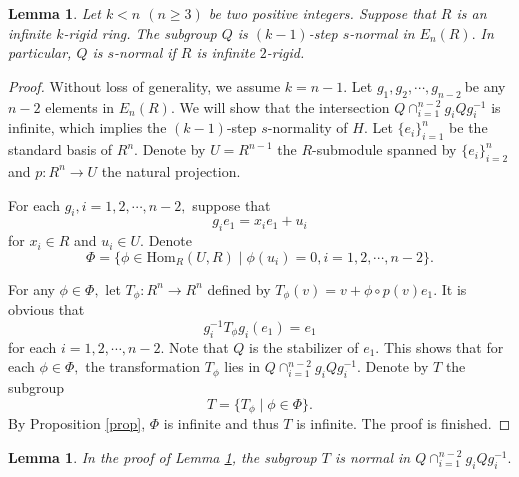 \documentclass{gtpart}     %
\newtheorem{lemma}[theorem]{Lemma}
\begin{document}
\begin{lemma}
\label{ke}Let $k<n$ $(n\geq 3)$ be two positive integers. Suppose that $R$
is an infinite $k$-rigid ring. The subgroup $Q$ is $(k-1)$-step $s$-normal
in $E_{n}(R).$ In particular, $Q$ is $s$-normal if $R$ is infinite $2$-rigid.
\end{lemma}

\begin{proof}
Without loss of generality, we assume $k=n-1.$ Let $g_{1},g_{2},\cdots
,g_{n-2}\ $be any $n-2$ elements in $E_{n}(R).$ We will show that the
intersection $Q\cap _{i=1}^{n-2}g_{i}Qg_{i}^{-1}$ is infinite, which implies
the $(k-1)$-step $s$-normality of $H$. Let $\{e_{i}\}_{i=1}^{n}$ be the
standard basis of $R^{n}.$ Denote by $U=R^{n-1}$ the $R$-submodule spanned
by $\{e_{i}\}_{i=2}^{n}$ and $p:R^{n}\rightarrow U$ the natural projection.

For each $g_{i},i=1,2,\cdots ,n-2,$ suppose that
\begin{equation*}
g_{i}e_{1}=x_{i}e_{1}+u_{i}
\end{equation*}%
for $x_{i}\in R$ and $u_{i}\in U.$ Denote
\begin{equation*}
\Phi =\{\phi \in \mathrm{Hom}_{R}(U,R)\mid \phi (u_{i})=0,i=1,2,\cdots
,n-2\}.
\end{equation*}

For any $\phi \in \Phi ,$ let $T_{\phi }:R^{n}\rightarrow R^{n}$ defined by $%
T_{\phi }(v)=v+\phi \circ p(v)e_{1}.$ It is obvious that
\begin{equation*}
g_{i}^{-1}T_{\phi }g_{i}(e_{1})=e_{1}
\end{equation*}%
for each $i=1,2,\cdots ,n-2.$ Note that $Q$ is the stabilizer of $e_{1}$.
This shows that for each $\phi \in \Phi ,$ the transformation $T_{\phi }$
lies in $Q\cap _{i=1}^{n-2}g_{i}Qg_{i}^{-1}.$ Denote by $T$ the subgroup
\begin{equation*}
T=\{T_{\phi }\mid \phi \in \Phi \}.
\end{equation*}%
By Proposition \ref{prop}, $\Phi $ is infinite and thus $T$ is infinite. The
proof is finished.
\end{proof}

\begin{lemma}
\label{new}In the proof of Lemma \ref{ke}, the subgroup $T$ is normal in $%
Q\cap _{i=1}^{n-2}g_{i}Qg_{i}^{-1}.$
\end{lemma}
\end{document}
